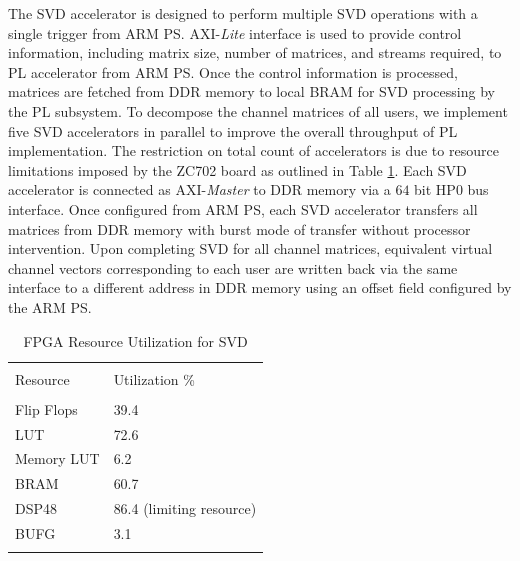 \documentclass[conference,letterpaper,10pt]{./../../IEEE/IEEEtran}
\begin{document}
The SVD accelerator is designed to perform multiple SVD operations with a single trigger from ARM PS. AXI-\textit{Lite} interface is used to provide control information, including matrix size, number of matrices, and streams required, to PL accelerator from ARM PS. Once the control information is processed, matrices are fetched from DDR memory to local BRAM for SVD processing by the PL subsystem. To decompose the channel matrices of all users, we implement five SVD accelerators in parallel to improve the overall throughput of PL implementation. The restriction on total count of accelerators is due to resource limitations imposed by the ZC702 board as outlined in Table \ref{tbl-utilization}. Each SVD accelerator is connected as AXI-\textit{Master} to DDR memory via a $64$ bit HP$0$ bus interface. Once configured from ARM PS, each SVD accelerator transfers all matrices from DDR memory with burst mode of transfer without processor intervention. Upon completing SVD for all channel matrices, equivalent virtual channel vectors corresponding to each user are written back via the same interface to a different address in DDR memory using an offset field configured by the ARM PS.
\begin{table} \caption{FPGA Resource Utilization for SVD} \begin{center} \small \begin{tabular}{l l} \hline \\
			Resource 	&  	Utilization \% \\ 
			\hline \\
			Flip Flops 	& 	39.4 \\
			LUT 		& 	72.6 \\
			Memory LUT 	& 	6.2 \\
			BRAM 		& 	60.7 \\
			DSP48 		& 	86.4 (limiting resource)\\
			BUFG 		& 	3.1 \\ 
			\hline \vspace{-0.3in}
		\end{tabular} \label{tbl-utilization} \end{center} \end{table}
\end{document}
